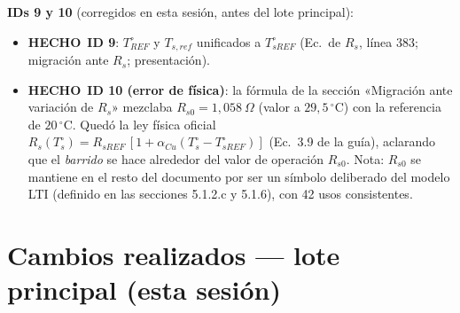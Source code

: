 \documentclass[11pt,a4paper]{article}
\newcommand{\hecho}{\textcolor{okgreen}{\textbf{HECHO}}}
\begin{document}
\textbf{IDs 9 y 10} (corregidos en esta sesión, antes del lote principal):
\begin{itemize}
  \item \hecho\ \textbf{ID 9}: $T_{REF}^\circ$ y $T_{s,ref}$ unificados a $T_{sREF}^\circ$ (Ec.\ de $R_s$, línea 383; migración ante $R_s$; presentación).
  \item \hecho\ \textbf{ID 10 (error de física)}: la fórmula de la sección «Migración ante variación de $R_s$» mezclaba $R_{s0}=1{,}058\ \Omega$ (valor a $29{,}5\,^\circ$C) con la referencia de $20\,^\circ$C. Quedó la ley física oficial $R_s(T_s^\circ)=R_{sREF}\,[1+\alpha_{Cu}(T_s^\circ - T_{sREF}^\circ)]$ (Ec.\ 3.9 de la guía), aclarando que el \emph{barrido} se hace alrededor del valor de operación $R_{s0}$. Nota: $R_{s0}$ se mantiene en el resto del documento por ser un símbolo deliberado del modelo LTI (definido en las secciones 5.1.2.c y 5.1.6), con 42 usos consistentes.
\end{itemize}

\section{Cambios realizados --- lote principal (esta sesión)}
\end{document}
